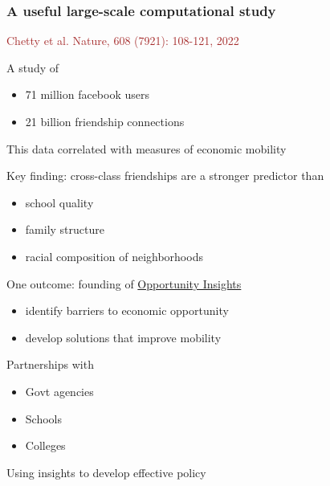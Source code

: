 \documentclass[
    xcolor={svgnames,dvipsnames},
    hyperref={colorlinks, citecolor=DeepPink4, linkcolor=DarkRed, urlcolor=DarkBlue}
    ]{beamer}  %
\newcommand{\brown}[1]{\textcolor{Brown}{\sf #1}}
\newcommand{\1}{\mathbbm 1}
\begin{document}
\begin{frame}
    \frametitle{A useful large-scale computational study}

    \brown{Chetty et al. Nature, 608 (7921): 108-121, 2022}

    A study of 
    \begin{itemize}
        \item 71 million facebook users
        \item 21 billion friendship connections
    \end{itemize}

    This data correlated with measures of economic mobility

            \vspace{0.3em}
            \vspace{0.3em}
            \vspace{0.3em}
    Key finding: cross-class friendships are a
    stronger predictor than
    \begin{itemize}
        \item school quality
            \vspace{0.3em}
        \item family structure
            \vspace{0.3em}
        \item racial composition of neighborhoods
    \end{itemize}

\end{frame}


\begin{frame}
    
    One outcome: founding of
    \href{https://opportunityinsights.org/}{Opportunity Insights}
            \vspace{0.3em}
            \vspace{0.3em}

    \begin{itemize}
        \item identify barriers to economic opportunity
            \vspace{0.3em}
        \item develop solutions that improve mobility
    \end{itemize}

            \vspace{0.3em}
            \vspace{0.3em}
    Partnerships with
    \begin{itemize}
        \item Govt agencies
            \vspace{0.3em}
        \item Schools 
            \vspace{0.3em}
        \item Colleges
    \end{itemize}

            \vspace{0.3em}

    Using insights to develop effective policy

\end{frame}
\end{document}
